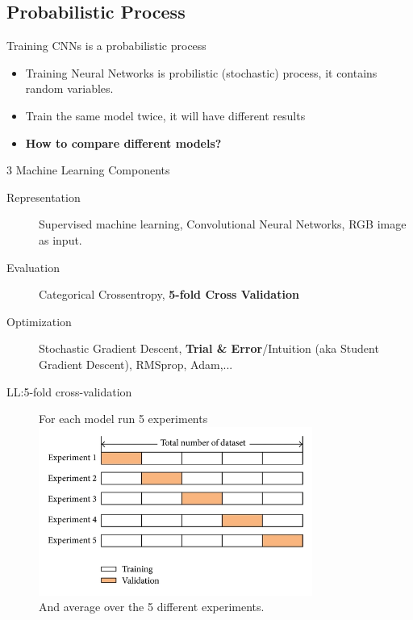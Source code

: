 \documentclass{beamer}
\begin{document}
\subsection{Probabilistic Process}
\begin{frame}{Training CNNs is a probabilistic process}
\begin{itemize}
 \item Training Neural Networks is probilistic (stochastic) process, it contains random variables. 
 \item Train the same model twice, it will have different results 
 \item \textbf{How to compare different models?}
\end{itemize}
\end{frame}

\begin{frame}{3 Machine Learning Components}
\begin{description}
 \item[Representation] Supervised machine learning, Convolutional Neural Networks, RGB image as input. 
 \item[Evaluation] Categorical Crossentropy, \textbf{5-fold Cross Validation}
 \item[Optimization] Stochastic Gradient Descent, \textbf{Trial \& Error}/Intuition (aka Student Gradient Descent), RMSprop, Adam,... 
\end{description}
\end{frame}


\begin{frame}{LL:5-fold cross-validation}
\begin{figure}
For each model run 5 experiments
\includegraphics[width=0.8\textwidth]{5foldCV} \\
And average over the 5 different experiments. 
\end{figure}
\end{frame}
\end{document}
